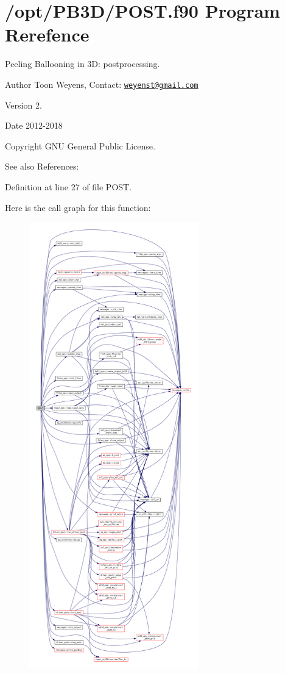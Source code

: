 \hypertarget{POST_8f90}{}\section{/opt/\+P\+B3\+D/\+P\+O\+ST.f90 Program Rerefence}
\label{POST_8f90}



Peeling Ballooning in 3D\+: postprocessing. 

\begin{DoxyAuthor}{Author}
Toon Weyens, Contact\+: \href{mailto:weyenst@gmail.com}{\tt weyenst@gmail.\+com} 
\end{DoxyAuthor}
\begin{DoxyVersion}{Version}
2. 
\end{DoxyVersion}
\begin{DoxyDate}{Date}
2012-\/2018 
\end{DoxyDate}
\begin{DoxyCopyright}{Copyright}
G\+NU General Public License. 
\end{DoxyCopyright}
\begin{DoxySeeAlso}{See also}
References\+: \cite{weyens2014theory} \cite{Weyens2017PB3D} 
\end{DoxySeeAlso}


Definition at line 27 of file P\+O\+S\+T.

Here is the call graph for this function\+:\nopagebreak
\begin{figure}[H]
\begin{center}
\leavevmode
\includegraphics[height=550pt]{POST_8f90_ac289b64ac4671fea0b4f2298ba1188a1_cgraph}
\end{center}
\end{figure}
